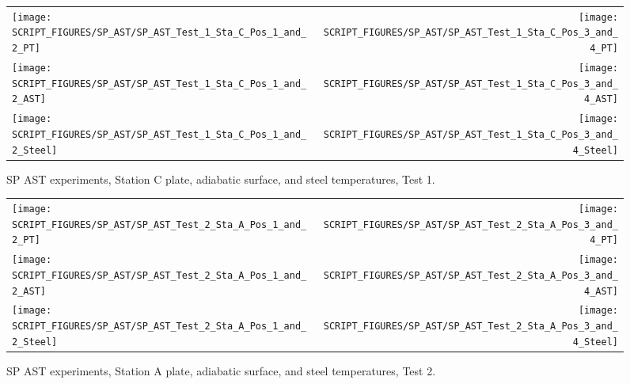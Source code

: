 \begin{figure}[p]
\begin{tabular*}{\textwidth}{l@{\extracolsep{\fill}}r}
\texttt{[image: SCRIPT\_FIGURES/SP\_AST/SP\_AST\_Test\_1\_Sta\_C\_Pos\_1\_and\_2\_PT]} &
\texttt{[image: SCRIPT\_FIGURES/SP\_AST/SP\_AST\_Test\_1\_Sta\_C\_Pos\_3\_and\_4\_PT]} \\
\texttt{[image: SCRIPT\_FIGURES/SP\_AST/SP\_AST\_Test\_1\_Sta\_C\_Pos\_1\_and\_2\_AST]} &
\texttt{[image: SCRIPT\_FIGURES/SP\_AST/SP\_AST\_Test\_1\_Sta\_C\_Pos\_3\_and\_4\_AST]} \\
\texttt{[image: SCRIPT\_FIGURES/SP\_AST/SP\_AST\_Test\_1\_Sta\_C\_Pos\_1\_and\_2\_Steel]} &
\texttt{[image: SCRIPT\_FIGURES/SP\_AST/SP\_AST\_Test\_1\_Sta\_C\_Pos\_3\_and\_4\_Steel]}
\end{tabular*}
\caption[SP AST experiments, Station C plate, adiabatic surface, and steel temperatures, Test 1]{SP AST experiments, Station C plate, adiabatic surface, and steel temperatures, Test 1.}
\label{SP_Test_1_Station_C}
\end{figure}


\begin{figure}[p]
\begin{tabular*}{\textwidth}{l@{\extracolsep{\fill}}r}
\texttt{[image: SCRIPT\_FIGURES/SP\_AST/SP\_AST\_Test\_2\_Sta\_A\_Pos\_1\_and\_2\_PT]} &
\texttt{[image: SCRIPT\_FIGURES/SP\_AST/SP\_AST\_Test\_2\_Sta\_A\_Pos\_3\_and\_4\_PT]} \\
\texttt{[image: SCRIPT\_FIGURES/SP\_AST/SP\_AST\_Test\_2\_Sta\_A\_Pos\_1\_and\_2\_AST]} &
\texttt{[image: SCRIPT\_FIGURES/SP\_AST/SP\_AST\_Test\_2\_Sta\_A\_Pos\_3\_and\_4\_AST]} \\
\texttt{[image: SCRIPT\_FIGURES/SP\_AST/SP\_AST\_Test\_2\_Sta\_A\_Pos\_1\_and\_2\_Steel]} &
\texttt{[image: SCRIPT\_FIGURES/SP\_AST/SP\_AST\_Test\_2\_Sta\_A\_Pos\_3\_and\_4\_Steel]}
\end{tabular*}
\caption[SP AST experiments, Station A plate, adiabatic surface, and steel temperatures, Test 2]{SP AST experiments, Station A plate, adiabatic surface, and steel temperatures, Test 2.}
\label{SP_Test_2_Station_A}
\end{figure}

